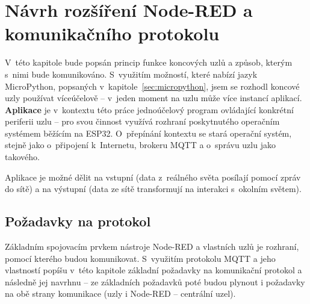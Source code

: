 \chapter{Návrh rozšíření Node-RED a komunikačního protokolu}
\label{ch:protokol}

V~této kapitole bude popsán princip funkce koncových uzlů a způsob, kterým s~nimi bude komunikováno.
S~využitím možností, které nabízí jazyk MicroPython, popsaných v~kapitole~\ref{sec:micropython}, jsem se rozhodl
koncové uzly používat víceúčelově -- v~jeden moment na uzlu může více instancí aplikací.
\textbf{Aplikace} je v~kontextu této práce jednoúčelový program ovládající konkrétní periferii uzlu -- pro svou činnost
využívá rozhraní poskytnutého operačním systémem běžícím na ESP32.
O~přepínání kontextu se stará operační systém, stejně jako o~připojení k~Internetu, brokeru MQTT a o~správu uzlu jako
takového.

Aplikace je možné dělit na vstupní (data z~reálného světa posílají pomocí zpráv do sítě) a na výstupní (data ze sítě
transformují na interakci s~okolním světem).

\section{Požadavky na protokol}\label{sec:pozadavky-na-protokol}
Základním spojovacím prvkem nástroje Node-RED a vlastních uzlů je rozhraní, pomocí kterého budou
komunikovat.
S~využitím protokolu MQTT a jeho vlastností popíšu v~této kapitole základní požadavky na komunikační protokol a
následně jej navrhnu -- ze základních požadavků poté budou plynout i požadavky na obě strany komunikace (uzly i
Node-RED -- centrální uzel).

